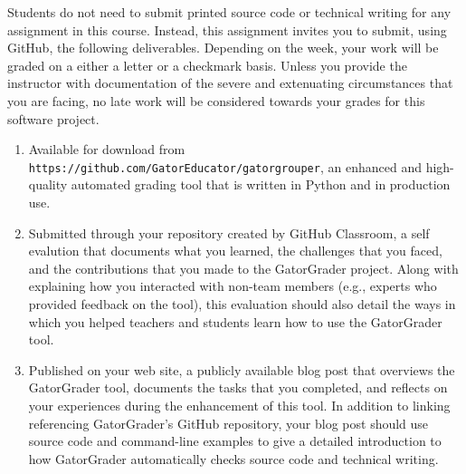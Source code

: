 \documentclass[11pt]{article}
\newcommand{\url}[1]{\lstinline{#1}}
\begin{document}
\noindent Students do not need to submit printed source code or technical
writing for any assignment in this course. Instead, this assignment invites you
to submit, using GitHub, the following deliverables. Depending on the week, your
work will be graded on a either a letter or a checkmark basis.
%
Unless you provide the instructor with documentation of the severe and
extenuating circumstances that you are facing, no late work will be considered
towards your grades for this software project.

\begin{enumerate}

\setlength{\itemsep}{0in}

\item Available for download from
  \url{https://github.com/GatorEducator/gatorgrouper}, an enhanced and
  high-quality automated grading tool that is written in Python and in
  production use.

\item Submitted through your repository created by GitHub Classroom, a self
  evalution that documents what you learned, the challenges that you faced, and
  the contributions that you made to the GatorGrader project. Along with
  explaining how you interacted with non-team members (e.g., experts who
  provided feedback on the tool), this evaluation should also detail the ways in
  which you helped teachers and students learn how to use the GatorGrader tool.

\item Published on your web site, a publicly available blog post that overviews
  the GatorGrader tool, documents the tasks that you completed, and reflects on
  your experiences during the enhancement of this tool. In addition to linking
  referencing GatorGrader's GitHub repository, your blog post should use source
  code and command-line examples to give a detailed introduction to how
  GatorGrader automatically checks source code and technical writing.

\end{enumerate}
\end{document}
